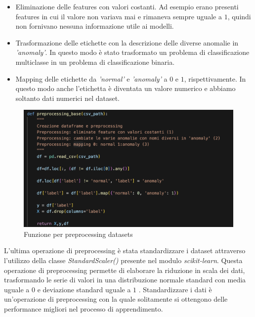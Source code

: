 \begin{itemize}
    \item Eliminazione delle features con valori costanti. Ad esempio erano presenti features in cui il valore non variava mai e rimaneva sempre uguale a $1$, quindi non fornivano nessuna informazione utile ai modelli.
    \item Trasformazione delle etichette con la descrizione delle diverse anomalie in \textit{'anomaly'}. In questo modo \`e stato trasformato un problema di classificazione multiclasse in un problema di classificazione binaria.
    \item Mapping delle etichette da \textit{'normal'} e \textit{'anomaly'} a $0$ e $1$, rispettivamente. In questo modo anche l'etichetta \`e diventata un valore numerico e abbiamo soltanto dati numerici nel dataset.
\end{itemize}

\begin{figure}[H]
    \centering
    \includegraphics[width=0.9\linewidth]{preprocessing.png}
    \caption{Funzione per preprocessing datasets}
    \label{fig:enter-label}
\end{figure}

L'ultima operazione di preprocessing \`e stata standardizzare i dataset attraverso l'utilizzo della classe \textit{StandardScaler()} presente nel modulo \textit{scikit-learn}. Questa operazione di preprocessing permette di elaborare la riduzione in scala dei dati, trasformando le serie di valori in una distribuzione normale standard con media uguale a $0$ e deviazione standard uguale a $1$ \cite{stdscaler}. Standardizzare i dati \`e un'operazione di preprocessing con la quale solitamente si ottengono delle performance migliori nel processo di apprendimento.

